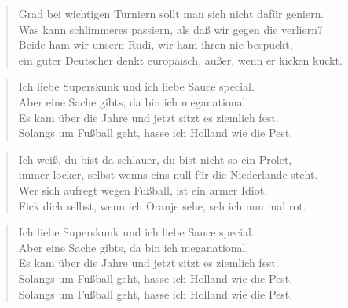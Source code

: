 \documentclass[9pt,a4paper,oneside, onecolumn]{article}
\begin{document}
\begin{verse}
Grad bei wichtigen Turniern sollt man sich nicht dafür geniern.\\
Was kann schlimmeres passiern, als daß wir gegen die verliern?\\
Beide ham wir unsern Rudi, wir ham ihren nie bespuckt,\\
ein guter Deutscher denkt europäisch, außer, wenn er kicken kuckt.\\
\end{verse}

\begin{verse}
Ich liebe Superskunk und ich liebe Sauce special.\\
Aber eine Sache gibts, da bin ich meganational.\\
Es kam über die Jahre und jetzt sitzt es ziemlich fest.\\
Solangs um Fußball geht, hasse ich Holland wie die Pest.\\
\end{verse}

\begin{verse}
Ich weiß, du bist da schlauer, du bist nicht so ein Prolet,\\
immer locker, selbst wenns eins null für die Niederlande steht.\\
Wer sich aufregt wegen Fußball, ist ein armer Idiot.\\
Fick dich selbst, wenn ich Oranje sehe, seh ich nun mal rot.\\
\end{verse}

\begin{verse}
Ich liebe Superskunk und ich liebe Sauce special.\\
Aber eine Sache gibts, da bin ich meganational.\\
Es kam über die Jahre und jetzt sitzt es ziemlich fest.\\
Solangs um Fußball geht, hasse ich Holland wie die Pest.\\
Solangs um Fußball geht, hasse ich Holland wie die Pest.\\
\end{verse}

\end{document}

